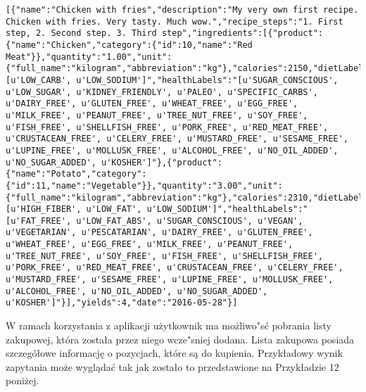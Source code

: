 \documentclass{article}
\begin{document}
\begin{lstlisting}[label=recipe_api,caption=Pobranie przepisu,breaklines=true]
[{"name":"Chicken with fries","description":"My very own first recipe. Chicken with fries. Very tasty. Much wow.","recipe_steps":"1. First step, 2. Second step. 3. Third step","ingredients":[{"product":{"name":"Chicken","category":{"id":10,"name":"Red Meat"}},"quantity":"1.00","unit":{"full_name":"kilogram","abbreviation":"kg"},"calories":2150,"dietLabels":"[u'LOW_CARB', u'LOW_SODIUM']","healthLabels":"[u'SUGAR_CONSCIOUS', u'LOW_SUGAR', u'KIDNEY_FRIENDLY', u'PALEO', u'SPECIFIC_CARBS', u'DAIRY_FREE', u'GLUTEN_FREE', u'WHEAT_FREE', u'EGG_FREE', u'MILK_FREE', u'PEANUT_FREE', u'TREE_NUT_FREE', u'SOY_FREE', u'FISH_FREE', u'SHELLFISH_FREE', u'PORK_FREE', u'RED_MEAT_FREE', u'CRUSTACEAN_FREE', u'CELERY_FREE', u'MUSTARD_FREE', u'SESAME_FREE', u'LUPINE_FREE', u'MOLLUSK_FREE', u'ALCOHOL_FREE', u'NO_OIL_ADDED', u'NO_SUGAR_ADDED', u'KOSHER']"},{"product":{"name":"Potato","category":{"id":11,"name":"Vegetable"}},"quantity":"3.00","unit":{"full_name":"kilogram","abbreviation":"kg"},"calories":2310,"dietLabels":"[u'HIGH_FIBER', u'LOW_FAT', u'LOW_SODIUM']","healthLabels":"[u'FAT_FREE', u'LOW_FAT_ABS', u'SUGAR_CONSCIOUS', u'VEGAN', u'VEGETARIAN', u'PESCATARIAN', u'DAIRY_FREE', u'GLUTEN_FREE', u'WHEAT_FREE', u'EGG_FREE', u'MILK_FREE', u'PEANUT_FREE', u'TREE_NUT_FREE', u'SOY_FREE', u'FISH_FREE', u'SHELLFISH_FREE', u'PORK_FREE', u'RED_MEAT_FREE', u'CRUSTACEAN_FREE', u'CELERY_FREE', u'MUSTARD_FREE', u'SESAME_FREE', u'LUPINE_FREE', u'MOLLUSK_FREE', u'ALCOHOL_FREE', u'NO_OIL_ADDED', u'NO_SUGAR_ADDED', u'KOSHER']"}],"yields":4,"date":"2016-05-28"}]
\end{lstlisting}

W ramach korzystania z aplikacji użytkownik ma możliwo"sć pobrania listy zakupowej, która została przez niego wcze"sniej dodana. Lista zakupowa posiada szczegółowe informację o pozycjach, które są do kupienia. Przykładowy wynik zapytania może wyglądać tak jak zostało to przedstawione na Przykładzie 12 poniżej.
\end{document}
